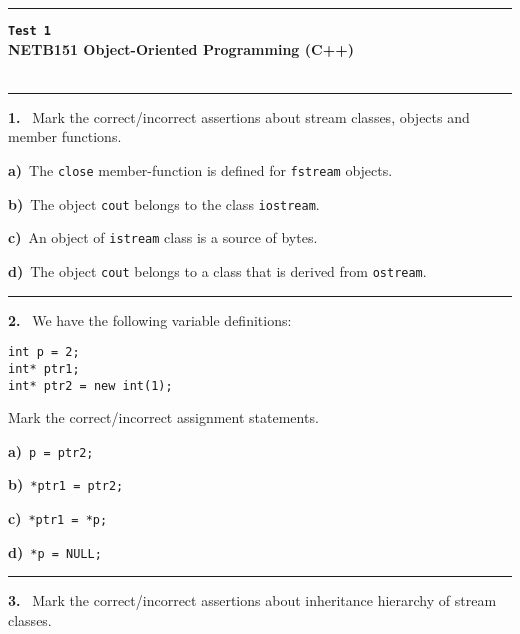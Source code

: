 \newpage\thispagestyle{empty}\par 
\hrule 
\begin{center}
{\bf\large {}}\hfill {\bf\large\verb|Test 1|}
 \hfill{\bf\large {}}\\ 
{\bf\large NETB151 Object-Oriented Programming (C++)}\\[4pt]
{\bf \large {}}\\ 
\end{center}\par
 \vspace{-4mm}
\begin{multicols}{2}
\par\smallskip\hrule\par\medskip

{\bf 1. }\ Mark the correct/incorrect assertions about stream classes, objects and
member functions.

{\bf a)}\ The \verb|close| member-function is defined for \verb|fstream| objects.

{\bf b)}\ The object \verb|cout| belongs to the class \verb|iostream|.

{\bf c)}\ An object of \verb|istream| class is a source of bytes.

{\bf d)}\ The object \verb|cout| belongs to a class that is derived from \verb|ostream|.

\par\smallskip\hrule\par\medskip

{\bf 2. }\ We have the following variable definitions:
 \vspace{-3mm}\begin{verbatim}
int p = 2;
int* ptr1;
int* ptr2 = new int(1);
 \end{verbatim}\vspace{-6mm}
Mark the correct/incorrect assignment statements.

{\bf a)}\ \verb|p = ptr2;|

{\bf b)}\ \verb|*ptr1 = ptr2;|

{\bf c)}\ \verb|*ptr1 = *p;|

{\bf d)}\ \verb|*p = NULL;|

\par\smallskip\hrule\par\medskip

{\bf 3. }\ Mark the correct/incorrect assertions about inheritance
hierarchy of stream classes.


\end{multicols}

